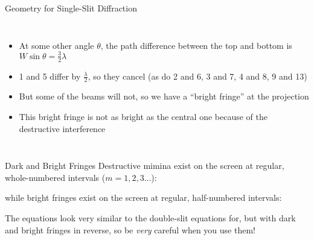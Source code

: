 \documentclass[12pt,compress,aspectratio=169]{beamer}
\newcommand{\eq}[2]{\vspace{#1}{\LARGE\begin{displaymath}#2\end{displaymath}}}
\begin{document}
\begin{frame}{Geometry for Single-Slit Diffraction}
  \begin{columns}

    \begin{itemize}
    \item At some other angle $\theta$, the path difference between the top
      and bottom is $\displaystyle W\sin\theta=\frac32\lambda$
    \item 1 and 5 differ by $\displaystyle\frac{\lambda}2$, so they cancel
      (as do 2 and 6, 3 and 7, 4 and 8, 9 and 13)
    \item But some of the beams will not, so we have a ``bright fringe'' at the 
      projection
    \item This bright fringe is not as bright as the central one because
      of the destructive interference
    \end{itemize}
  \end{columns}
\end{frame}



\begin{frame}{Dark and Bright Fringes}
  Destructive mimina exist on the screen at regular, whole-numbered intervals
  ($m=1,2,3\ldots$):

  \eq{-.2in}{
    \boxed{m\lambda=W\sin\theta_m}
  }

  while bright fringes exist on the screen at regular, half-numbered intervals:

  \eq{-.2in}{
    \boxed{\left(m+\frac12\right)\lambda=W\sin\theta_m}
  }

  The equations look very similar to the double-slit equations for, but with
  dark and bright fringes in reverse, so be \emph{very} careful when you use
  them!
\end{frame}
\end{document}
